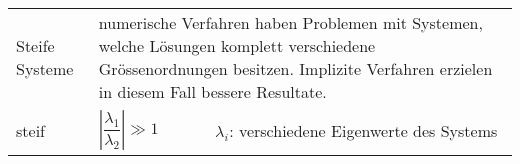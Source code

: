 \begin{tabularx}{\columnwidth}{p{3cm}XX}
	Steife Systeme & \multicolumn{2}{p{14cm}}{numerische Verfahren haben Problemen mit Systemen, welche Lösungen komplett verschiedene Grössenordnungen besitzen. Implizite Verfahren erzielen in diesem Fall bessere Resultate.}\\
	steif & $\left|\dfrac{\lambda_1}{\lambda_2}\right| \gg 1$ & $\lambda_i$: verschiedene Eigenwerte des Systems \\
	\hline 
	
	\end{tabularx}